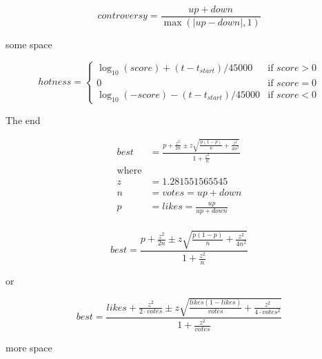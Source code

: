 \documentclass[11pt]{amsart}
\begin{document}


$$ 
controversy = \frac{up + down} { \max( | up - down | , 1)}
$$ 

some space




\begin{equation*} 
hotness = 
\begin{cases} 
\log_{10}(score) + (t-t_{start}) / 45000   & \text{if $score > 0$}\\ 
0                                                                             & \text{if $score = 0$}\\ 
\log_{10}(-score) -  (t-t_{start})  / 45000   & \text{if $score < 0$} 
\end{cases} 
\end{equation*} 

The end


\begin{align*} 
best & = \frac { p +\frac{z^2}{2n} \pm z \sqrt {\frac{p(1-p)}{n} + \frac{z^2}{4n^2} }  }{1 + \frac{z^2}{n}} \\
\text{where}\\
z & = 1.281551565545\\
n & = votes = up + down\\
p & = likes = \frac{up}{up+down}\\
\end{align*} 

\begin{equation*} 
best = \frac { p +\frac{z^2}{2n} \pm z \sqrt {\frac{p(1-p)}{n} + \frac{z^2}{4n^2} }  }{1 + \frac{z^2}{n}}
\end{equation*} 

or 

\begin{equation*} 
best = \frac { likes +\frac{z^2}{2 \cdot votes} \pm z \sqrt {\frac{likes(1-likes)}{votes} + \frac{z^2}{4 \cdot votes^2} }  }{1 + \frac{z^2}{votes}}
\end{equation*} 

more space 
\end{document}
